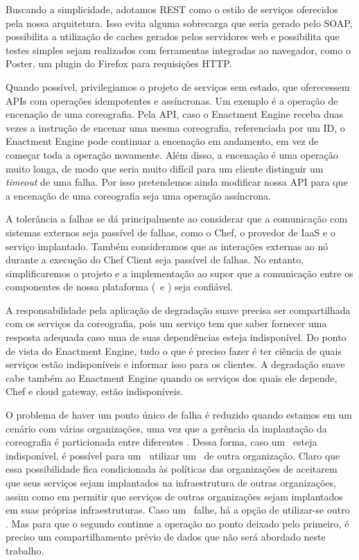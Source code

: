 Buscando a simplicidade, adotamos REST como o estilo de serviços oferecidos pela nossa arquitetura. Isso evita alguma sobrecarga que seria gerado pelo SOAP, possibilita a utilização de caches gerados pelos servidores web e possibilita que testes simples sejam realizados com ferramentas integradas ao navegador, como o Poster, um plugin do Firefox para requisições HTTP.

Quando possível, privilegiamos o projeto de serviços sem estado, que oferecessem APIs com operações idempotentes e assíncronas. Um exemplo é a operação de encenação de uma coreografia. Pela API, caso o Enactment Engine receba duas vezes a instrução de encenar uma mesma coreografia, referenciada por um ID, o Enactment Engine pode continuar a encenação em andamento, em vez de começar toda a operação novamente. Além disso, a encenação é uma operação muito longa, de modo que seria muito difícil para um cliente distinguir um \textit{timeout} de uma falha. Por isso pretendemos ainda modificar nossa API para que a encenação de uma coreografia seja uma operação assíncrona.

A tolerância a falhas se dá principalmente ao considerar que a comunicação com sistemas externos seja passível de falhas, como o Chef, o provedor de IaaS e o serviço implantado. Também consideramos que as interações externas ao nó durante a execução do Chef Client seja passível de falhas. No entanto, simplificaremos o projeto e a implementação ao supor que a comunicação entre os componentes de nossa plataforma (\eecomp\ e \dm) seja confiável. 

A responsabilidade pela aplicação de degradação suave precisa ser compartilhada com os serviços da coreografia, pois um serviço tem que saber fornecer uma resposta adequada caso uma de suas dependências esteja indisponível. Do ponto de vista do Enactment Engine, tudo o que é preciso fazer é ter ciência de quais serviços estão indisponíveis e informar isso para os clientes. A degradação suave cabe também ao Enactment Engine quando os serviços dos quais ele depende, Chef e cloud gateway, estão indisponíveis.

O problema de haver um ponto único de falha é reduzido quando estamos em um cenário com várias organizações, uma vez que a gerência da implantação da coreografia é particionada entre diferentes . Dessa forma, caso um \dm\ esteja indisponível, é possível para um \eecomp\ utilizar um \dm\ de outra organização. Claro que essa possibilidade fica condicionada às políticas das organizações de aceitarem que seus serviços sejam implantados na infraestrutura de outras organizações, assim como em permitir que serviços de outras organizações sejam implantados em suas próprias infraestruturas. Caso um \eecomp\ falhe, há a opção de utilizar-se outro \eecomp. Mas para que o segundo continue a operação no ponto deixado pelo primeiro, é preciso um compartilhamento prévio de dados que não será abordado neste trabalho. 

